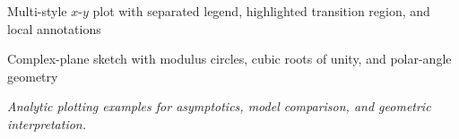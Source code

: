\begin{center}
    \resizebox{0.86\linewidth}{!}{}

    \small Multi-style \(x\)-\(y\) plot with separated legend, highlighted transition region, and local annotations

    \medskip
    \resizebox{0.58\linewidth}{!}{}

    \small Complex-plane sketch with modulus circles, cubic roots of unity, and polar-angle geometry

    \medskip
    \textit{Analytic plotting examples for asymptotics, model comparison, and geometric interpretation.}
\end{center}
